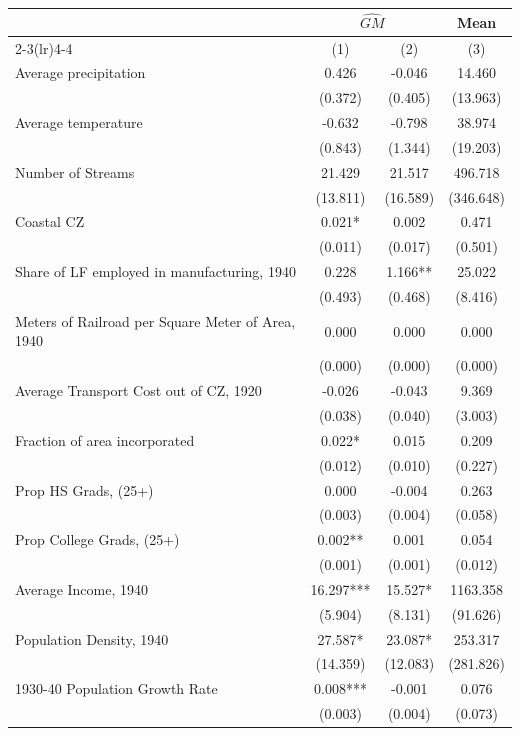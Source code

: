\begin{tabular}{l*{3}{c}} \toprule
&\multicolumn{2}{c}{$\widehat{GM}$}&\multicolumn{1}{c}{Mean}\\\cmidrule(lr){2-3}\cmidrule(lr){4-4}
&\multicolumn{1}{c}{(1)}&\multicolumn{1}{c}{(2)}&\multicolumn{1}{c}{(3)}\\
\midrule 
Average precipitation  &    0.426 & -0.046 & 14.460 \\
                &  (0.372)  &  (0.405)  &  (13.963)    \\
Average temperature  &    -0.632 & -0.798 & 38.974 \\
                &  (0.843)  &  (1.344)  &  (19.203)    \\
Number of Streams  &    21.429 & 21.517 & 496.718 \\
                &  (13.811)  &  (16.589)  &  (346.648)    \\
Coastal CZ  &    0.021* & 0.002 & 0.471 \\
                &  (0.011)  &  (0.017)  &  (0.501)    \\
Share of LF employed in manufacturing, 1940  &    0.228 & 1.166** & 25.022 \\
                &  (0.493)  &  (0.468)  &  (8.416)    \\
Meters of Railroad per Square Meter of Area, 1940  &    0.000 & 0.000 & 0.000 \\
                &  (0.000)  &  (0.000)  &  (0.000)    \\
Average Transport Cost out of CZ, 1920  &    -0.026 & -0.043 & 9.369 \\
                &  (0.038)  &  (0.040)  &  (3.003)    \\
Fraction of area incorporated  &    0.022* & 0.015 & 0.209 \\
                &  (0.012)  &  (0.010)  &  (0.227)    \\
Prop HS Grads, (25+)  &    0.000 & -0.004 & 0.263 \\
                &  (0.003)  &  (0.004)  &  (0.058)    \\
Prop College Grads, (25+)  &    0.002** & 0.001 & 0.054 \\
                &  (0.001)  &  (0.001)  &  (0.012)    \\
Average Income, 1940  &    16.297*** & 15.527* & 1163.358 \\
                &  (5.904)  &  (8.131)  &  (91.626)    \\
Population Density, 1940  &    27.587* & 23.087* & 253.317 \\
                &  (14.359)  &  (12.083)  &  (281.826)    \\
1930-40 Population Growth Rate  &    0.008*** & -0.001 & 0.076 \\
                &  (0.003)  &  (0.004)  &  (0.073)    \\
\bottomrule \end{tabular}
